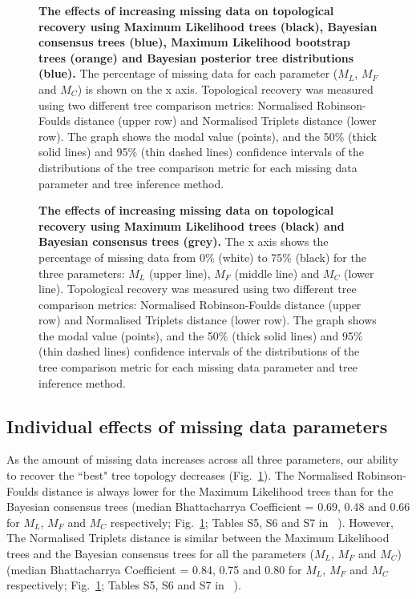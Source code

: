\documentclass[10pt,letterpaper]{article}
\begin{document}
\begin{figure}[]
\caption{{\bf The effects of increasing missing data on topological recovery using Maximum Likelihood trees (black), Bayesian consensus trees (blue), Maximum Likelihood bootstrap trees (orange) and Bayesian posterior tree distributions (blue).}
 The percentage of missing data for each parameter ($M_{L}$, $M_{F}$ and $M_{C}$) is shown on the x axis. Topological recovery was measured using two different tree comparison metrics: Normalised Robinson-Foulds distance (upper row) and Normalised Triplets distance (lower row). The graph shows the modal value (points), and the 50\% (thick solid lines) and 95\% (thin dashed lines) confidence intervals of the distributions of the tree comparison metric for each missing data parameter and tree inference method.}
\label{Fig_Results-permeth_perparam} 
\end{figure}

\begin{figure}[]
\caption{{\bf The effects of increasing missing data on topological recovery using Maximum Likelihood trees (black) and Bayesian consensus trees (grey).}
 The x axis shows the percentage of missing data from 0\% (white) to 75\% (black) for the three parameters: $M_{L}$ (upper line), $M_{F}$ (middle line) and $M_{C}$ (lower line). Topological recovery was measured using two different tree comparison metrics: Normalised Robinson-Foulds distance (upper row) and Normalised Triplets distance (lower row). The graph shows the modal value (points), and the 50\% (thick solid lines) and 95\% (thin dashed lines) confidence intervals of the distributions of the tree comparison metric for each missing data parameter and tree inference method.} 
\label{Fig_Results-global_perparam}
\end{figure}

\subsection*{Individual effects of missing data parameters}
As the amount of missing data increases across all three parameters, our ability to recover the ``best" tree topology decreases (Fig.~\ref{Fig_Results-permeth_perparam}).
The Normalised Robinson-Foulds distance is always lower for the Maximum Likelihood trees than for the Bayesian consensus trees (median Bhattacharrya Coefficient = 0.69, 0.48 and 0.66 for $M_{L}$, $M_{F}$ and $M_{C}$ respectively; Fig.~\ref{Fig_Results-permeth_perparam}; Tables S5, S6 and S7 in ~). 
However, The Normalised Triplets distance is similar between the Maximum Likelihood trees and the Bayesian consensus trees for all the parameters ($M_{L}$, $M_{F}$ and $M_{C}$) (median Bhattacharrya Coefficient = 0.84, 0.75 and 0.80 for $M_{L}$, $M_{F}$ and $M_{C}$ respectively; Fig.~\ref{Fig_Results-permeth_perparam}; Tables S5, S6 and S7 in ~).
\end{document}

